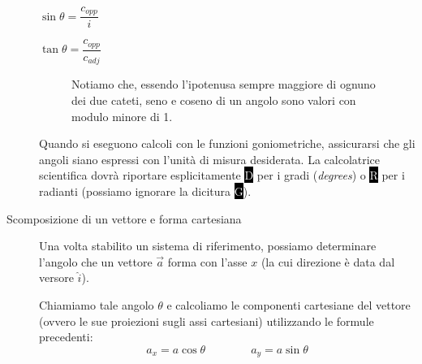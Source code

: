 \documentclass[a4paper,11pt,italian]{article}
\begin{document}
\begin{description}
\begin{multicols}{3}
\begin{center}
  $ \sin\theta = \dfrac{c_{opp}}{i} $
  
  $ \tan\theta = \dfrac{c_{opp}}{c_{adj}} $
  \end{center}
\end{multicols}
  \begin{figure}[htb]\centering
  \caption{Notiamo che, essendo l'ipotenusa sempre maggiore di ognuno dei due cateti, seno e coseno di un angolo sono valori con modulo minore di 1.}
  \end{figure}
  
  Quando si eseguono calcoli con le funzioni goniometriche, assicurarsi che gli angoli siano espressi con l'unità di misura desiderata. 
  La calcolatrice scientifica dovrà riportare esplicitamente \colorbox{black}{\textcolor{white}{D}} per i gradi (\emph{degrees}) o \colorbox{black}{\textcolor{white}{R}} per i radianti (possiamo ignorare la dicitura \colorbox{black}{\textcolor{white}{G}}).
  
  \item[Scomposizione di un vettore e forma cartesiana]
  Una volta stabilito un sistema di riferimento, possiamo determinare l'angolo che un vettore $ \vec{a} $ forma con l'asse $ x $ (la cui direzione è data dal versore $ \hat{i} $).
  
  Chiamiamo tale angolo $ \theta $ e calcoliamo le componenti cartesiane del vettore (ovvero le sue proiezioni sugli assi cartesiani) utilizzando le formule precedenti:
  \[ a_x = a  \cos\theta \quad\quad\quad\quad a_y = a  \sin\theta \]
  

\end{description}
\end{document}
